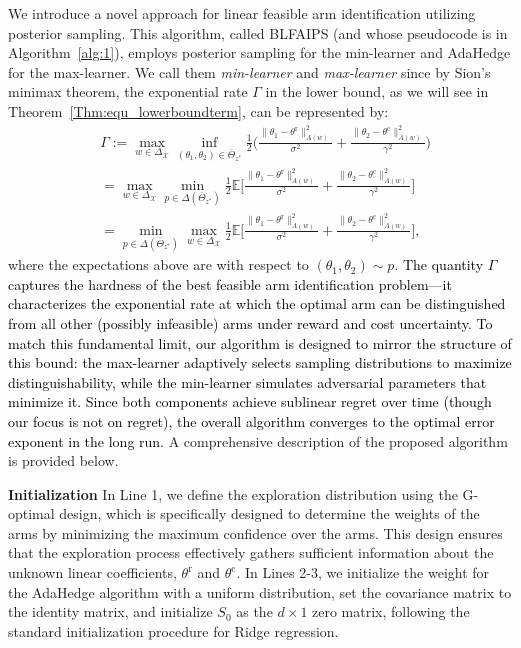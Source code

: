 \documentclass[accepted]{uai2025} %
\newcommand{\red}[1]{\textcolor{black}{#1}}
\theoremstyle{plain}
\theoremstyle{definition}
\theoremstyle{remark}
\newcommand{\thetac}{\theta^{\mathrm{c}}}
\newcommand{\thetar}{\theta^{\mathrm{r}}}
\newcommand{\EE}{\mathbb{E}} %
\begin{document}
We introduce a novel approach for linear feasible arm identification utilizing posterior sampling. This algorithm, called BLFAIPS (and whose pseudocode is in Algorithm~\ref{alg:1}), employs posterior sampling for the min-learner and AdaHedge for the max-learner. We call them  {\em min-learner} and {\em max-learner} since by Sion's minimax theorem, the exponential rate $\Gamma$ in the lower bound, as we will see in Theorem~\ref{Thm:equ_lowerboundterm}, can be represented by:
\begin{align*}
    &\Gamma:=\max_{w\in \Delta_\mathcal{X}}\inf_{(\theta_1, \theta_2)\in\overline{\Theta}_{z^*}}\! \frac{1}{2} \bigg( \frac{\lVert\theta_1\!-\!\thetar\rVert^2_{A(w)^{}}}{\sigma^2}\!+\!\frac{\lVert\theta_2\!-\!\thetac\rVert^2_{A(w)^{}}}{\gamma^2}\bigg)
    \\&=\max_{w\in \Delta_\mathcal{X}}\min_{p\in{\Delta(\overline{\Theta}_{z^*})}} \frac{1}{2} \EE\bigg[  \frac{\lVert\theta_1\!-\!\thetar\rVert^2_{A(w)^{}}}{\sigma^2}\!+\!\frac{\lVert\theta_2\!-\!\thetac\rVert^2_{A(w)^{}}}{\gamma^2}\bigg]
    \\&=\min_{p\in{\Delta(\overline{\Theta}_{z^*})}} \max_{w\in \Delta_\mathcal{X}} \frac{1}{2}\EE \bigg[ \frac{\lVert\theta_1\!-\!\thetar\rVert^2_{A(w)^{}}}{\sigma^2}\!+\!\frac{\lVert\theta_2\!-\!\thetac\rVert^2_{A(w)^{}}}{\gamma^2}\bigg],
\end{align*}
where the expectations above are with respect to $(\theta_1,\theta_2)\sim p$.
\red{The quantity \( \Gamma \) captures the hardness of the best feasible arm identification problem—it characterizes the exponential rate at which the optimal arm can be distinguished from all other (possibly infeasible) arms under reward and cost uncertainty. To match this fundamental limit, our algorithm is designed to mirror the structure of this bound: the max-learner adaptively selects sampling distributions to maximize distinguishability, while the min-learner simulates adversarial parameters that minimize it. Since both components achieve sublinear regret over time (though our focus is not on regret), the overall algorithm converges to the optimal error exponent in the long run.} A comprehensive description of the proposed algorithm is provided below.

\textbf{Initialization}
In Line 1, we define the exploration distribution using the G-optimal design, which is specifically designed to determine the weights of the arms by minimizing the maximum confidence over the arms. This design ensures that the exploration process effectively gathers sufficient information about the unknown linear coefficients, $\thetar$ and $\thetac$. In Lines 2-3, we initialize the weight for the AdaHedge algorithm with a uniform distribution, set the covariance matrix to the identity matrix, and initialize $S_0$ as the $d \times 1$ zero matrix, following the standard initialization procedure for Ridge regression.
\end{document}
